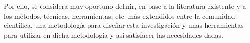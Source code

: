 
Por ello, se considera muy oportuno definir, en base a la literatura existente y a los métodos, técnicas, herramientas, etc. más extendidos entre la comunidad científica, una metodología para diseñar esta investigación y unas herramientas para utilizar en dicha metodología y así satisfacer las necesidades dadas.

